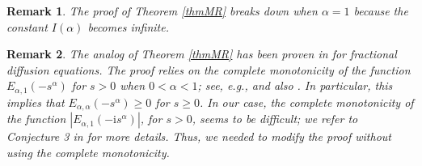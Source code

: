 \documentclass[reqno]{amsart}
\newtheorem{rmk}{Remark}
\numberwithin{equation}{section}
\begin{document}
\begin{rmk}
The proof of Theorem \ref{thmMR} breaks down when $\alpha=1$ because the constant $I(\alpha)$ becomes infinite.
\end{rmk}
\begin{rmk}
The analog of Theorem \ref{thmMR} has been proven in \cite[Theorem 2.2~(i)]{SY11} for fractional diffusion equations. The proof relies on the complete monotonicity of the function $E_{\alpha,1}(-s^\alpha)$ for $s > 0$ when $0<\alpha<1$; see, e.g., \cite{Po48} and also \cite{Sc96}. In particular, this implies that $E_{\alpha,\alpha}(-s^\alpha)\ge 0$ for $s \ge 0$. In our case, the complete monotonicity of the function $|E_{\alpha,1}(-\mathrm{i}s^\alpha)|$, for $s > 0$, seems to be difficult; we refer to Conjecture 3 in \cite{CEMY25} for more details. Thus, we needed to modify the proof without using the complete monotonicity.
\end{rmk}
\end{document}
